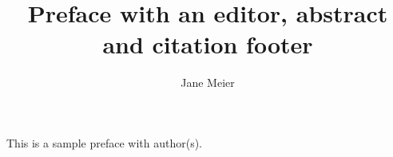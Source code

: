 \documentclass[output=paper]{langsci/langscibook.cls}
\title{Preface with an editor, abstract and citation footer}
\author{Jane Meier  \affiliation{University of Eden}}
\begin{document}
\maketitle

\noindent This is a sample preface with author(s). 

\sloppy
\printbibliography[heading=subbibliography,notkeyword=this]
\end{document}
